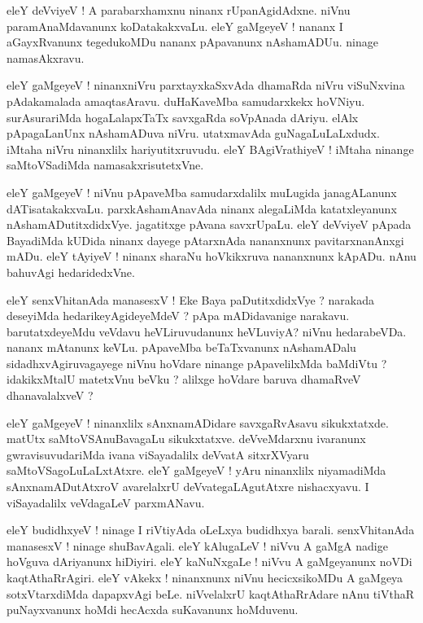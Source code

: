 \documentclass{article}
\begin{document}
\begin{mn}%
eleY deVviyeV ! A parabarxhamxnu ninanx rUpanAgidAdxne. niVnu paramAnaMdavanunx 
koDatakakxvaLu. eleY gaMgeyeV ! nananx I aGayxRvanunx tegedukoMDu nananx pApavanunx 
nAshamADUu. ninage  namasAkxravu.
\end{mn}

\begin{mn}%
eleY gaMgeyeV ! ninanxniVru parxtayxkaSxvAda dhamaRda niVru viSuNxvina pAdakamalada 
amaqtasAravu. duHaKaveMba samudarxkekx hoVNiyu. surAsurariMda hogaLalapxTaTx savxgaRda 
soVpAnada dAriyu. elAlx pApagaLanUnx nAshamADuva niVru. utatxmavAda guNagaLuLaLxdudx. iMtaha 
niVru ninanxlilx hariyutitxruvudu. eleY BAgiVrathiyeV ! iMtaha ninange saMtoVSadiMda 
namasakxrisutetxVne.
\end{mn}

\begin{mn}%
eleY gaMgeyeV ! niVnu pApaveMba samudarxdalilx muLugida janagALanunx dATisatakakxvaLu. 
parxkAshamAnavAda ninanx alegaLiMda katatxleyanunx nAshamADutitxdidxVye. jagatitxge pAvana 
savxrUpaLu. eleY deVviyeV pApada BayadiMda kUDida ninanx dayege pAtarxnAda nananxnunx 
pavitarxnanAnxgi mADu. eleY tAyiyeV ! ninanx sharaNu hoVkikxruva nananxnunx kApADu. nAnu 
bahuvAgi hedaridedxVne.
\end{mn}

\begin{mn}%
eleY senxVhitanAda manasesxV ! Eke Baya paDutitxdidxVye ? narakada deseyiMda 
hedarikeyAgideyeMdeV ? pApa mADidavanige narakavu. barutatxdeyeMdu veVdavu heVLiruvudanunx 
heVLuviyA? niVnu hedarabeVDa. nananx mAtanunx keVLu. pApaveMba beTaTxvanunx nAshamADalu 
sidadhxvAgiruvagayege niVnu hoVdare ninange pApavelilxMda baMdiVtu ? idakikxMtalU matetxVnu 
beVku ? alilxge hoVdare baruva dhamaRveV dhanavalalxveV ?
\end{mn}

\begin{mn}%
eleY gaMgeyeV ! ninanxlilx sAnxnamADidare savxgaRvAsavu sikukxtatxde. matUtx 
saMtoVSAnuBavagaLu sikukxtatxve. deVveMdarxnu ivaranunx gwravisuvudariMda ivana 
viSayadalilx deVvatA sitxrXVyaru saMtoVSagoLuLaLxtAtxre. eleY gaMgeyeV ! yAru ninanxlilx 
niyamadiMda sAnxnamADutAtxroV avarelalxrU deVvategaLAgutAtxre  nishacxyavu. I viSayadalilx 
veVdagaLeV parxmANavu.
\end{mn}

\begin{mn}%
eleY budidhxyeV ! ninage I riVtiyAda oLeLxya budidhxya barali. senxVhitanAda manasesxV ! 
ninage shuBavAgali. eleY kAlugaLeV ! niVvu A gaMgA nadige hoVguva dAriyanunx hiDiyiri. eleY 
kaNuNxgaLe ! niVvu A gaMgeyanunx noVDi kaqtAthaRrAgiri. eleY vAkekx ! ninanxnunx niVnu 
hecicxsikoMDu A gaMgeya sotxVtarxdiMda dapapxvAgi beLe. niVvelalxrU kaqtAthaRrAdare nAnu 
tiVthaR puNayxvanunx hoMdi hecAcxda suKavanunx hoMduvenu.
\end{mn}
\end{document}
